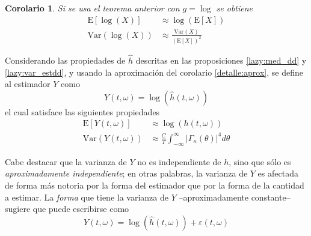 \documentclass[12pt,letterpaper]{book}
\newtheorem{corolario}[teorema]{Corolario}
\newcommand{\intR}{\int_{-\infty}^{\infty}}
\newcommand{\E}[1]{\mathrm{E}\left[ #1 \right]}
\newcommand{\Var}[1]{\mathrm{Var}\left( #1 \right)}
\newcommand{\abso}[1]{\left| #1 \right|}
\begin{document}
\begin{corolario}
Si se usa el teorema anterior con $g = \log$ se obtiene
\begin{align}
\E{\log(X)} &\approx \log\left( \E{X} \right) \\
\Var{\log(X)} &\approx \frac{\Var{X}}{\left( \E{X} \right)^{2}}
\end{align}
\end{corolario}

Considerando las propiedades de $\widehat{h}$ descritas en las proposiciones \ref{lazy:med_dd} y \ref{lazy:var_estdd}, y usando la aproximación del corolario \ref{detalle:aprox}, se define al estimador $Y$ como
\begin{equation}
Y(t,\omega) = \log\left(\widehat{h}(t,\omega)\right)
\end{equation}
el cual satisface las siguientes propiedades
\begin{align}
\E{Y(t,\omega)} &\approx \log\left(h(t,\omega)\right) \\
\Var{Y(t,\omega)} &\approx \frac{C}{T} \intR \abso{\Gamma_\kappa(\theta)}^{4} d\theta
\end{align}

%

Cabe destacar que la varianza de $Y$ no es independiente de $h$, sino que sólo es \textit{aproximadamente independiente}; en otras palabras, la varianza de $Y$ es afectada de forma más notoria por la forma del estimador que por la forma de la cantidad a estimar.
%
%
%
La \textit{forma} que tiene la varianza de $Y$ --aproximadamente constante-- sugiere que puede escribirse como
\begin{equation}
Y(t,\omega) = \log\left(\widehat{h}(t,\omega) \right) + \varepsilon(t,\omega)
\label{ye}
\end{equation}
\end{document}
